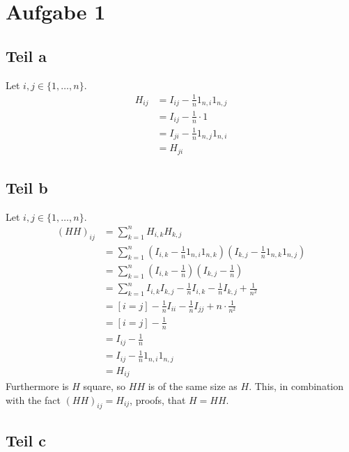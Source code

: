 \documentclass[10pt,a4paper]{article}
\begin{document}
\section{Aufgabe 1}

\subsection{Teil a}

Let $i, j \in \{ 1, \dots, n \}$.
\begin{align*}
  H_{ij} & = I_{ij} - \frac{1}{n} 1_{n,i}1_{n,j}\\
         & = I_{ij} - \frac{1}{n} \cdot 1\\
         & = I_{ji} - \frac{1}{n} 1_{n,j}1_{n,i}\\
         & = H_{ji}
\end{align*}

\subsection{Teil b}

Let $i, j \in \{ 1, \dots, n \}$.
\begin{align*}
  (HH)_{ij} & = \sum_{k = 1}^{n} H_{i, k}H_{k, j}\\
            & = \sum_{k = 1}^{n} \left( I_{i, k} - \frac{1}{n} 1_{n, i}1_{n, k} \right)\left( I_{k, j} - \frac{1}{n} 1_{n, k}1_{n, j} \right)\\
            & = \sum_{k = 1}^{n} \left( I_{i, k} - \frac{1}{n} \right)\left( I_{k, j} - \frac{1}{n} \right)\\
            & = \sum_{k = 1}^{n} I_{i, k}I_{k, j} - \frac{1}{n} I_{i, k} - \frac{1}{n} I_{k, j} + \frac{1}{n^{2}} \\
            & = [i = j] - \frac{1}{n}I_{ii} - \frac{1}{n} I_{jj} + n \cdot \frac{1}{n^{2}}\\
            & = [i = j] - \frac{1}{n}\\
            & = I_{ij} - \frac{1}{n}\\
            & = I_{ij} - \frac{1}{n} 1_{n,i}1_{n,j}\\
            & = H_{ij}
\end{align*}
Furthermore is $H$ square, so $HH$ is of the same size as $H$. This, in
combination with the fact $(HH)_{ij} = H_{ij}$, proofs, that $H = HH$.

\subsection{Teil c}
\end{document}
